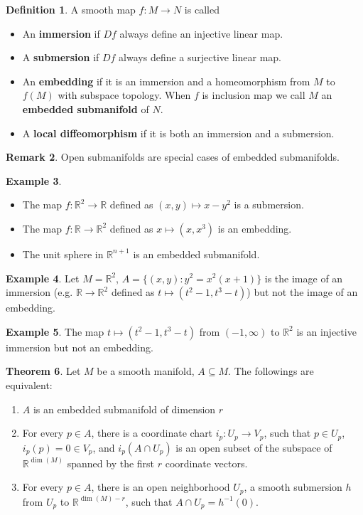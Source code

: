 \documentclass{article}
\theoremstyle{definition}
\newtheorem{thm}{Theorem}[section]
\newtheorem{dfn}[thm]{Definition}
\newtheorem{rmk}[thm]{Remark}
\newtheorem{exm}[thm]{Example}
\begin{document}
\begin{dfn}
    A smooth map $f: M\rightarrow N$ is called
    \begin{itemize}
        \item An {\bf immersion} if $Df$ always define an injective linear map.
        \item A {\bf submersion} if $Df$ always define a surjective linear map.
        \item An {\bf embedding} if it is an immersion and a homeomorphism from $M$ to $f(M)$ with subspace topology. When $f$ is inclusion map we call $M$ an {\bf embedded submanifold} of $N$.
        \item A {\bf local diffeomorphism} if it is both an immersion and a submersion.
    \end{itemize}
\end{dfn}

\begin{rmk}
    Open submanifolds are special cases of embedded submanifolds.
\end{rmk}

\begin{exm}
\begin{itemize}
\item The map $f: \mathbb{R}^2\rightarrow \mathbb{R}$ defined as $(x, y)\mapsto x-y^2$ is a submersion.
\item The map $f: \mathbb{R}\rightarrow \mathbb{R}^2$ defined as $x\mapsto (x, x^3)$ is an embedding.
\item The unit sphere in $\mathbb{R}^{n+1}$ is an embedded submanifold.
\end{itemize}
\end{exm}

\begin{exm}
    Let $M=\mathbb{R}^2$, $A=\{(x, y): y^2=x^2(x+1)\}$ is the image of an immersion (e.g. $\mathbb{R}\rightarrow \mathbb{R}^2$ defined as $t\mapsto (t^2-1, t^3-t)$) but not the image of an embedding.
\end{exm}

\begin{exm}
    The map $t\mapsto (t^2-1, t^3-t)$ from $(-1, \infty)$ to $\mathbb{R}^2$ is an injective immersion but not an embedding.
\end{exm}

\begin{thm}
    Let $M$ be a smooth manifold, $A\subseteq M$. The followings are equivalent:
    \begin{enumerate}
        \item $A$ is an embedded submanifold of dimension $r$
        \item For every $p\in A$, there is a coordinate chart $i_p: U_p\rightarrow V_p$, such that $p\in U_p$, $i_p(p)=0\in V_p$, and $i_p(A\cap U_p)$ is an open subset of the subspace of $\mathbb{R}^{\dim(M)}$ spanned by the first $r$ coordinate vectors.
        \item For every $p\in A$, there is an open neighborhood $U_p$, a smooth submersion $h$ from $U_p$ to $\mathbb{R}^{\dim(M)-r}$, such that $A\cap U_p=h^{-1}(0)$.
    \end{enumerate}
\end{thm}
\end{document}
